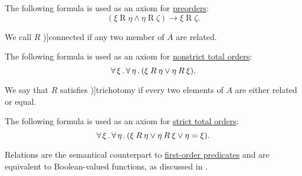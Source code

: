 \begin{definition}
\begin{thmenum}[resume=def:binary_relation]
    The following formula is used as an axiom for \hyperref[def:partially_ordered_set]{preorders}:
    \begin{equation}\label{eq:def:binary_relation/transitive}
      (\xi \mathbin{R} \eta \wedge \eta \mathbin{R} \zeta) \rightarrow \xi \mathbin{R} \zeta.
    \end{equation}

     We call \( R \) \term[ru=полное (отношение) (\cite[def. 2.7]{Гуров2013})]{connected} if any two member of \( A \) are related.

    The following formula is used as an axiom for \hyperref[def:totally_ordered_set]{nonstrict total orders}:
    \begin{equation}\label{eq:def:binary_relation/connected}
      \forall \thinspace \xi \thinspace . \thinspace \forall \thinspace \eta \thinspace . \thinspace (\xi \mathbin{R} \eta \vee \eta \mathbin{R} \xi).
    \end{equation}

     We say that \( R \) satisfies \term[bg=трихотомия (\cite[11]{Тагамлицки1971Диф})]{trichotomy} if every two elements of \( A \) are either related or equal.

    The following formula is used as an axiom for \hyperref[def:totally_ordered_set]{strict total orders}:
    \begin{equation}\label{eq:def:binary_relation/trichotomy}
      \forall \thinspace \xi \thinspace . \thinspace \forall \thinspace \eta \thinspace . \thinspace (\xi \mathbin{R} \eta \vee \eta \mathbin{R} \xi \vee \eta = \xi).
    \end{equation}
  \end{thmenum}
\end{definition}
\begin{comments}
  \item Relations are the semantical counterpart to \hyperref[def:first_order_structure/interpretation/predicate]{first-order predicates} and are equivalent to Boolean-valued functions, as discussed in .
\end{comments}

